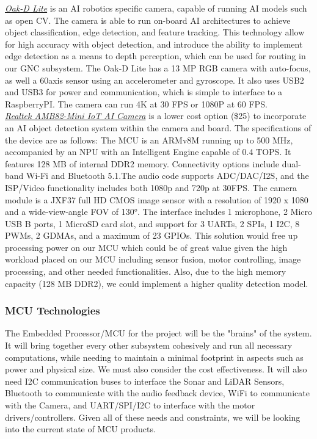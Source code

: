 \noindent \underline{\textit{Oak-D Lite}} is an AI robotics specific camera, capable of running AI models such as open CV. The camera is able to run on-board AI architectures to achieve object classification, edge detection, and feature tracking. This technology allow for high accuracy with object detection, and introduce the ability to implement edge detection as a means to depth perception, which can be used for routing in our GNC subsystem. The Oak-D Lite has a 13 MP RGB camera with auto-focus, as well a 60axis sensor using an accelerometer and gyroscope. It also uses USB2 and USB3 for power and communication, which is simple to interface to a RaspberryPI. The camera can run 4K at 30 FPS or 1080P at 60 FPS.\\

\noindent \underline{\textit{Realtek AMB82-Mini IoT AI Camera}} is a lower cost option (\$25) to incorporate an AI object detection system within the camera and board. The specifications of the device are as follows: The MCU is an ARMv8M running up to 500 MHz, accompanied by an NPU with an Intelligent Engine capable of 0.4 TOPS. It features 128 MB of internal DDR2 memory. Connectivity options include dual-band Wi-Fi and Bluetooth 5.1.The audio code supports ADC/DAC/I2S, and the ISP/Video functionality includes both 1080p and 720p at 30FPS. The camera module is a JXF37 full HD CMOS image sensor with a resolution of 1920 x 1080 and a wide-view-angle FOV of 130°. The interface includes 1 microphone, 2 Micro USB B ports, 1 MicroSD card slot, and support for 3 UARTs, 2 SPIs, 1 I2C, 8 PWMs, 2 GDMAs, and a maximum of 23 GPIOs. This solution would free up processing power on our MCU which could be of great value given the high workload placed on our MCU including sensor fusion, motor controlling, image processing, and other needed functionalities. Also, due to the high memory capacity (128 MB DDR2), we could implement a higher quality detection model.\\


\subsubsection{MCU Technologies}
\label{sec:mcu_tech}
\noindent The Embedded Processor/MCU for the project will be the "brains" of the system. It will bring together every other subsystem cohesively and run all necessary computations, while needing to maintain a minimal footprint in aspects such as power and physical size. We must also consider the cost effectiveness. It will also need I2C communication buses to interface the Sonar and LiDAR Sensors, Bluetooth to communicate with the audio feedback device, WiFi to communicate with the Camera, and UART/SPI/I2C to interface with the motor drivers/controllers. Given all of these needs and constraints, we will be looking into the current state of MCU products. \\

